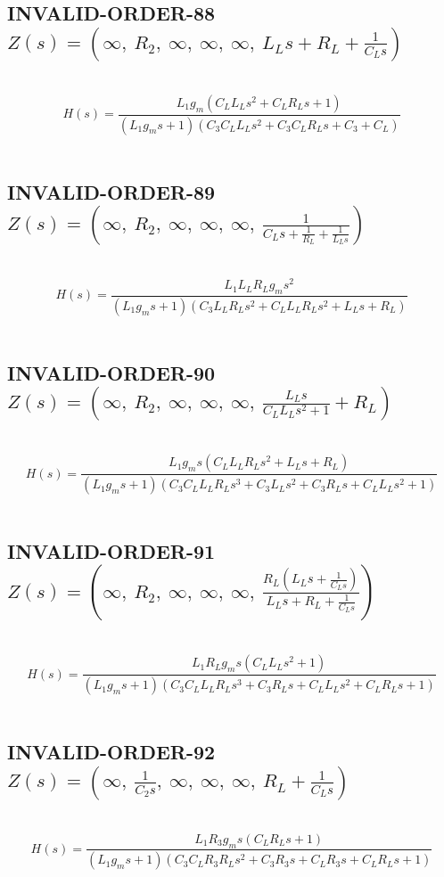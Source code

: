 \documentclass{article}
\begin{document}
\subsection{INVALID-ORDER-88 $Z(s) = \left( \infty, \  R_{2}, \  \infty, \  \infty, \  \infty, \  L_{L} s + R_{L} + \frac{1}{C_{L} s}\right)$ } \ 
\textbf{\[H(s) = \frac{L_{1} g_{m} \left(C_{L} L_{L} s^{2} + C_{L} R_{L} s + 1\right)}{\left(L_{1} g_{m} s + 1\right) \left(C_{3} C_{L} L_{L} s^{2} + C_{3} C_{L} R_{L} s + C_{3} + C_{L}\right)}\] } \ 
\subsection{INVALID-ORDER-89 $Z(s) = \left( \infty, \  R_{2}, \  \infty, \  \infty, \  \infty, \  \frac{1}{C_{L} s + \frac{1}{R_{L}} + \frac{1}{L_{L} s}}\right)$ } \ 
\textbf{\[H(s) = \frac{L_{1} L_{L} R_{L} g_{m} s^{2}}{\left(L_{1} g_{m} s + 1\right) \left(C_{3} L_{L} R_{L} s^{2} + C_{L} L_{L} R_{L} s^{2} + L_{L} s + R_{L}\right)}\] } \ 
\subsection{INVALID-ORDER-90 $Z(s) = \left( \infty, \  R_{2}, \  \infty, \  \infty, \  \infty, \  \frac{L_{L} s}{C_{L} L_{L} s^{2} + 1} + R_{L}\right)$ } \ 
\textbf{\[H(s) = \frac{L_{1} g_{m} s \left(C_{L} L_{L} R_{L} s^{2} + L_{L} s + R_{L}\right)}{\left(L_{1} g_{m} s + 1\right) \left(C_{3} C_{L} L_{L} R_{L} s^{3} + C_{3} L_{L} s^{2} + C_{3} R_{L} s + C_{L} L_{L} s^{2} + 1\right)}\] } \ 
\subsection{INVALID-ORDER-91 $Z(s) = \left( \infty, \  R_{2}, \  \infty, \  \infty, \  \infty, \  \frac{R_{L} \left(L_{L} s + \frac{1}{C_{L} s}\right)}{L_{L} s + R_{L} + \frac{1}{C_{L} s}}\right)$ } \ 
\textbf{\[H(s) = \frac{L_{1} R_{L} g_{m} s \left(C_{L} L_{L} s^{2} + 1\right)}{\left(L_{1} g_{m} s + 1\right) \left(C_{3} C_{L} L_{L} R_{L} s^{3} + C_{3} R_{L} s + C_{L} L_{L} s^{2} + C_{L} R_{L} s + 1\right)}\] } \ 
\subsection{INVALID-ORDER-92 $Z(s) = \left( \infty, \  \frac{1}{C_{2} s}, \  \infty, \  \infty, \  \infty, \  R_{L} + \frac{1}{C_{L} s}\right)$ } \ 
\textbf{\[H(s) = \frac{L_{1} R_{3} g_{m} s \left(C_{L} R_{L} s + 1\right)}{\left(L_{1} g_{m} s + 1\right) \left(C_{3} C_{L} R_{3} R_{L} s^{2} + C_{3} R_{3} s + C_{L} R_{3} s + C_{L} R_{L} s + 1\right)}\] } \ 
\end{document}
